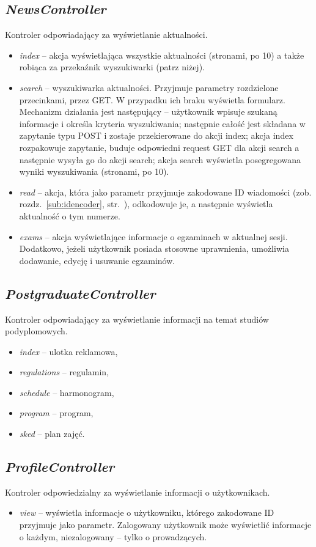 \documentclass[a4paper,12pt,oneside]{report}
\begin{document}
\subsection{\emph{NewsController}}
\label{con:news}
  Kontroler odpowiadający za wyświetlanie aktualności.
\begin{itemize}
  \item \emph{index} -- akcja wyświetlająca wszystkie aktualności (stronami, po 10) a także robiąca za przekaźnik wyszukiwarki (patrz niżej). 
  \item \emph{search} -- wyszukiwarka aktualności. Przyjmuje parametry rozdzielone przecinkami, przez GET. W przypadku ich braku wyświetla formularz. Mechanizm działania jest następujący -- użytkownik wpisuje szukaną informacje i określa kryteria wyszukiwania; następnie całość jest składana w zapytanie typu POST i zostaje przekierowane do akcji index; akcja index rozpakowuje zapytanie, buduje odpowiedni request GET dla akcji search a następnie wysyła go do akcji search; akcja search wyświetla posegregowana wyniki wyszukiwania (stronami, po 10).
  \item \emph{read} -- akcja, która jako parametr przyjmuje zakodowane ID wiadomości (zob. rozdz.~\ref{sub:idencoder}, str.~\pageref{sub:idencoder}), odkodowuje je, a następnie wyświetla aktualność o tym numerze.
  \item \emph{exams} -- akcja wyświetlające informacje o egzaminach w aktualnej sesji. Dodatkowo, jeżeli użytkownik posiada stosowne uprawnienia, umożliwia dodawanie, edycję i usuwanie egzaminów. 
\end{itemize}

\subsection{\emph{PostgraduateController}}
\label{con:postgraduate}
  Kontroler odpowiadający za wyświetlanie informacji na temat studiów podyplomowych.
\begin{itemize}
  \item \emph{index} -- ulotka reklamowa,
  \item \emph{regulations} -- regulamin,
  \item \emph{schedule} -- harmonogram,
  \item \emph{program} -- program,
  \item \emph{sked} -- plan zajęć.
\end{itemize}

\subsection{\emph{ProfileController}}
\label{con:profile}
  Kontroler odpowiedzialny za wyświetlanie informacji o użytkownikach.
\begin{itemize}
  \item \emph{view} -- wyświetla informacje o użytkowniku, którego zakodowane ID przyjmuje jako parametr. Zalogowany użytkownik może wyświetlić informacje o każdym, niezalogowany -- tylko o prowadzących.
\end{itemize}
\end{document}
